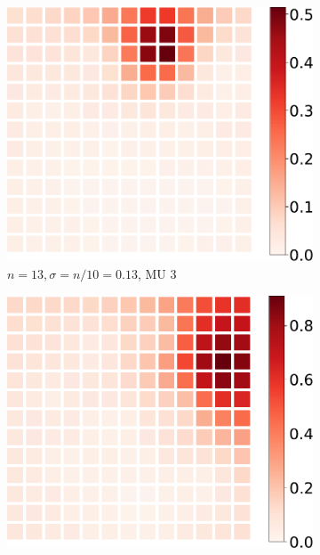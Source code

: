 \begin{figure}%
  \centering%
  \begin{subfigure}[t]{0.31\textwidth}%
    \centering%
    \includegraphics[width=\textwidth]{images/motor_unit_assignment/MU_fibre_distribution_13x13_10_fibers_mu3.pdf}%
    \caption{$n=13, \sigma = n/10 = 0.13$, MU 3}%
    \label{fig:MU_fibre_distribution_13x13_10_fibers_mu3}%
  \end{subfigure}
  \quad
  \begin{subfigure}[t]{0.31\textwidth}%
    \centering%
    \includegraphics[width=\textwidth]{images/motor_unit_assignment/MU_fibre_distribution_13x13_10_fibers_mu9.pdf}%

\end{subfigure}
\end{figure}
